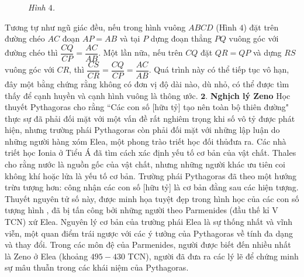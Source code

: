 \begin{multicols}{2}
\begin{figure}[H]
		\caption{\small\textit{\color{lichsutoanhoc}Hình $4$.}}
		\vspace*{-10pt}
	\end{figure}
	Tương tự như ngũ giác đều, nếu trong hình vuông $ABCD$ (Hình $4$) đặt trên đường chéo $AC$ đoạn $AP = AB$  và tại $P$  dựng đoạn thẳng $PQ$  vuông góc với đường chéo thì $\dfrac{CQ}{CP} = \dfrac{AC}{AB}$. Một lần nữa, nếu trên $CQ$  đặt $QR = QP$ và  dựng $RS$  vuông góc với $CR$,  thì  $\dfrac{CS}{CR} = \dfrac{CQ}{CP} = \dfrac{AC}{AB}$. Quá trình này có thể tiếp tục vô hạn, đây một bằng chứng rằng không có đơn vị độ dài nào, dù nhỏ, có thể được tìm thấy để cạnh huyền và cạnh hình vuông là thông ước.
	\vskip 0.1cm
	\vskip 0.1cm
	$\pmb{2.}$ \textbf{\color{lichsutoanhoc}Nghịch lý Zeno}
	\vskip 0.1cm
	Học thuyết Pythagoras cho rằng ``Các con số [hữu tỷ] tạo nên toàn bộ thiên đường" thực sự đã phải đối mặt với một vấn đề rất nghiêm trọng khi số vô tỷ được phát hiện, nhưng trường phái Pythagoras còn phải đối mặt với những lập luận do những người hàng xóm Elea, một phong trào triết học đối thủ\linebreak đưa ra. 
	\vskip 0.1cm
	Các nhà triết học Ionia ở Tiểu Á đã tìm cách xác định yếu tố cơ bản của vật chất.
	\vskip 0.1cm
	Thales cho rằng nước là nguồn gốc của vật chất, nhưng những người khác ưu tiên coi không khí hoặc lửa là yếu tố cơ bản. Trường phái Pythagoras đã theo một hướng trừu tượng hơn: công nhận các con số [hữu tỷ] là cơ bản đằng sau các hiện tượng. Thuyết nguyên tử số này, được minh họa tuyệt đẹp trong hình học của các con số tượng hình , đã bị tấn công bởi những người theo Parmenides (đầu thế kỉ V TCN) xứ Elea. Nguyên lý cơ bản của trường phái Elea là sự thống nhất và vĩnh viễn, một quan điểm trái ngược với các ý tưởng của Pythagoras về tính đa dạng và thay đổi.  Trong các môn đệ của Parmenides, người được biết đến nhiều nhất là Zeno ở Elea (khoảng $495-430$ TCN), người đã đưa ra các lý lẽ để chứng minh sự mâu thuẫn trong các khái niệm của Pythagoras.

\end{multicols}
